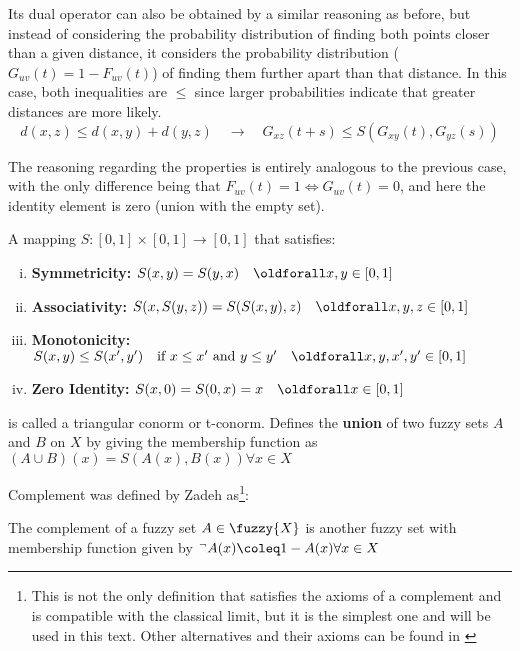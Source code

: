 Its dual operator can also be obtained by a similar reasoning as before, but instead of considering the probability distribution of finding both points closer than a given distance, it considers the probability distribution ($G_{uv}(t) = 1 - F_{uv}(t)$) of finding them further apart than that distance. In this case, both inequalities are $\leq$ since larger probabilities indicate that greater distances are more likely.
\begin{equation}\label{eq:Gtriangle_inequality}
d(x, z) \leq d(x, y) + d(y, z) \quad \longrightarrow \quad G_{xz}(t + s) \leq S(G_{xy}(t), G_{yz}(s))
\end{equation}

The reasoning regarding the properties is entirely analogous to the previous case, with the only difference being that $F_{uv}(t) = 1 \Leftrightarrow  G_{uv}(t) = 0$, and here the identity element is zero (union with the empty set).



\begin{definition}
  A mapping $S:[0,1]\times [0,1] \longrightarrow [0,1]$ that satisfies:
  \begin{enumerate}[(i)]\setlength{\itemindent}{2em}
    \item \textbf{Symmetricity:} $S(x,y) = S(y,x) \quad \oldforall x,y \in [0,1]$
    \item \textbf{Associativity:} $S(x,S(y,z)) = S(S(x,y),z) \quad \oldforall x,y,z \in [0,1]$
    \item \textbf{Monotonicity:} $S(x,y) \leq S(x',y') \quad \textnormal{if }x\leq x' \textnormal{ and } y\leq y' \quad \oldforall x,y,x',y' \in [0,1]$
    \item \textbf{Zero Identity:} $S(x,0) = S(0,x) = x \quad \oldforall x \in [0,1]$
  \end{enumerate}
  is called a triangular conorm or t-conorm. Defines the \textbf{union} of two fuzzy sets $A$ and $B$ on $X$ by giving the membership function as $(A \cup  B) (x) = S(A(x),B(x)) \forall x \in X$ 
    
\end{definition}

Complement was defined by Zadeh \cite{Zadeh1965} as\footnote{This is not the only definition that satisfies the axioms of a complement and is compatible with the classical limit, but it is the simplest one and will be used in this text. Other alternatives and their axioms can be found in \cite{Sladoje2007}}:

\begin{definition}[Complement]
  The complement of a fuzzy set $A\in \fuzzy{X}$ is another fuzzy set with membership function given by $^\lnot A(x) \coleq 1 - A(x) \forall x\in X$
\end{definition}

